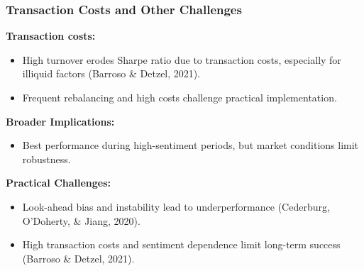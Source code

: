 \documentclass[9pt]{beamer}  %
\begin{document}
\begin{frame}
    \frametitle{Transaction Costs and Other Challenges}  %
    
    \textbf{Transaction costs:}  %
    \begin{itemize}  %
        \item High turnover erodes Sharpe ratio due to transaction costs, especially for illiquid factors (Barroso \& Detzel, 2021).
        \item Frequent rebalancing and high costs challenge practical implementation.
    \end{itemize}

    \vspace{0.5cm}  %

    \textbf{Broader Implications:}  %
    \begin{itemize}  %
        \item Best performance during high-sentiment periods, but market conditions limit robustness.
    \end{itemize}

    \vspace{0.5cm}  %

    \textbf{Practical Challenges:}  %
    \begin{itemize}  %
        \item Look-ahead bias and instability lead to underperformance (Cederburg, O’Doherty, \& Jiang, 2020).
        \item High transaction costs and sentiment dependence limit long-term success (Barroso \& Detzel, 2021).
    \end{itemize}
\end{frame}
\end{document}

